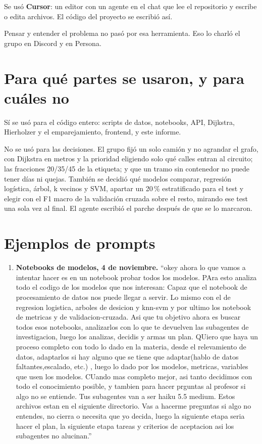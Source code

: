 \documentclass[12pt,a4paper]{report}
\begin{document}
Se usó \textbf{Cursor}: un editor con un agente en el chat que lee el repositorio y escribe o edita archivos. El código del proyecto se escribió así.

Pensar y entender el problema no pasó por esa herramienta. Eso lo charló el grupo en Discord y en Persona.

\section{Para qué partes se usaron, y para cuáles no}

Sí se usó para el código entero: scripts de datos, notebooks, API, Dijkstra, Hierholzer y el emparejamiento, frontend, y este informe.

No se usó para las decisiones. El grupo fijó un solo camión y no agrandar el grafo, con Dijkstra en metros y la prioridad eligiendo solo qué calles entran al circuito; las fracciones 20/35/45 de la etiqueta; y que un tramo sin contenedor no puede tener días ni quejas. También se decidió qué modelos comparar, regresión logística, árbol, k vecinos y SVM, apartar un 20\,\% estratificado para el test y elegir con el F1 macro de la validación cruzada sobre el resto, mirando ese test una sola vez al final. El agente escribió el parche después de que se lo marcaron.

\section{Ejemplos de prompts}

\begin{enumerate}
  
  \item \textbf{Notebooks de modelos, 4 de noviembre.} ``okey ahora lo que vamos a intentar hacer es en un notebook probar todos los modelos. PAra esto analiza todo el codigo de los modelos que nos interesan: Capaz que el notebook de procesamiento de datos nos puede llegar a servir. Lo mismo con el de regresion logistica, arboles de desicion y knn-svm y por ultimo los notebook de metricas y de validacion-cruzada. Asi que tu objetivo ahora es buscar todos esos notebooks, analizarlos con lo que te devuelven las subagentes de investigacion, luego los analizas, decidis y armas un plan. QUiero que haya un proceso completo con todo lo dado en la materia, desde el relevamiento de datos, adaptarlos si hay alguno que se tiene que adaptar(hablo de datos faltantes,escalado, etc.) , luego lo dado por los modelos, metricas, variables que usen los modelos. CUando mas completo mejor, asi tanto decidimos con todo el conocimiento posible, y tambien para hacer prguntas al profesor si algo no se entiende. Tus subagentes van a ser haiku 5.5 medium. Estos archivos estan en el siguiente directorio. Vas a hacerme preguntas si algo no entendes, no cierra o necesita que yo decida, luego la siguiente etapa seria hacer el plan, la siguiente etapa tareas y criterios de aceptacion asi los subagentes no alucinan.''
\end{enumerate}
\end{document}
